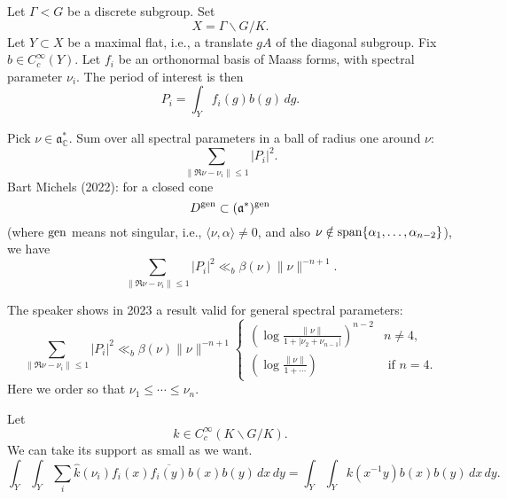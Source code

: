 \documentclass[reqno]{amsart} 
\begin{document}
Let $\Gamma < G$ be a discrete subgroup.  Set
\begin{equation*}
  X = \Gamma \backslash G / K.
\end{equation*}
Let $Y \subset X$ be a maximal flat, i.e., a translate $g A$ of the diagonal subgroup.  Fix $b \in C_c^\infty (Y) $.  Let $f_i$ be an orthonormal basis of Maass forms, with spectral parameter $\nu_i$.  The period of interest is then
\begin{equation*}
  P_i = \int_Y f_i (g) b (g) \, d g.
\end{equation*}

Pick $\nu \in \mathfrak{a}_{\mathbb{C} }^\ast $.  Sum over all spectral parameters in a ball of radius one around $\nu$:
\begin{equation*}
  \sum_{\lVert \Re \nu - \nu_i  \rVert \leq 1} \lvert P_i  \rvert^2.
\end{equation*}
Bart Michels (2022): for a closed cone
\begin{equation*}
  D^{\operatorname{gen}} \subset  (\mathfrak{a}^\ast )^{\operatorname{gen}}
\end{equation*}
(where $\operatorname{gen}$ means not singular, i.e., $\langle \nu, \alpha \rangle \neq 0$, and also $\nu \notin \operatorname{span} \{\alpha_1, \dotsc, \alpha_{n-2}\}$), we have
\begin{equation*}
  \sum_{\lVert \Re \nu - \nu_i  \rVert \leq 1} \lvert P_i  \rvert^2
  \ll_b \beta(\nu) \lVert \nu  \rVert^{- n + 1}.
\end{equation*}


The speaker shows in 2023 a result valid for general spectral parameters:
\begin{equation*}
  \sum_{\lVert \Re \nu - \nu_i  \rVert \leq 1} \lvert P_i  \rvert^2
  \ll_b \beta(\nu) \lVert \nu  \rVert^{- n + 1}
  \begin{cases}
    \left( \log \frac{\lVert \nu  \rVert}{1 + \lvert \nu_2 + \nu_{n - 1} \rvert} \right)^{n - 2}  & n \neq 4, \\
    \left( \log \frac{\lVert \nu  \rVert}{1 + \dotsb } \right) & \text{ if } n = 4.
  \end{cases}
\end{equation*}
Here we order so that $\nu_1 \leq \dotsb \leq \nu_n$.

Let
\begin{equation*}
  k \in C_c^\infty(K \backslash G / K).
\end{equation*}
We can take its support as small as we want.
\begin{equation*}
  \int_{Y} \int_Y
  \sum_i \hat{k}(\nu_i) f_i(x) \overline{f_i(y)}
  b(x) b(y) \,d x \,d y
  =
  \int_{Y} \int_{Y}
  k(x^{-1} y) b (x) b (y) \, d x \, d y.  
\end{equation*}
\end{document}
